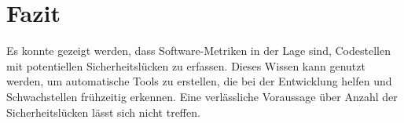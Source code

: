 \section{Fazit}
\label{sec:fazit}
Es konnte gezeigt werden, dass Software-Metriken in der Lage sind, Codestellen mit potentiellen Sicherheitslücken zu erfassen.
Dieses Wissen kann genutzt werden, um automatische Tools zu erstellen, die bei der Entwicklung helfen und Schwachstellen frühzeitig erkennen.
Eine verlässliche Voraussage über Anzahl der Sicherheitslücken lässt sich nicht treffen.
